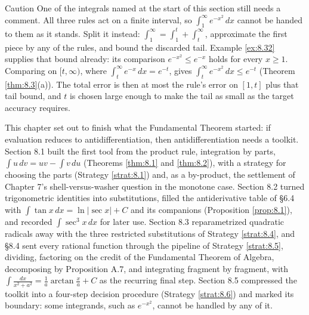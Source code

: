 \documentclass[a4paper,12pt,oneside]{memoir}
\begin{document}
\begin{envcaution}{Caution}{}{}
One of the integrals named at the start of this section still needs a comment. All three rules act on a finite interval, so \(\int_{1}^{\infty} e^{-x^{2}}\,dx\) cannot be handed to them as it stands. Split it instead: \(\int_{1}^{\infty} = \int_{1}^{t} + \int_{t}^{\infty}\), approximate the first piece by any of the rules, and bound the discarded tail. Example \ref{ex:8.32} supplies that bound already: its comparison \(e^{-x^{2}} \le e^{-x}\) holds for every \(x \ge 1\). Comparing on \([t, \infty)\), where \(\int_{t}^{\infty} e^{-x}\,dx = e^{-t}\), gives \(\int_{t}^{\infty} e^{-x^{2}}\,dx \le e^{-t}\) (Theorem \ref{thm:8.3}(a)). The total error is then at most the rule’s error on \([1, t]\) plus that tail bound, and \(t\) is chosen large enough to make the tail as small as the target accuracy requires.
\end{envcaution}
This chapter set out to finish what the Fundamental Theorem started: if evaluation reduces to antidifferentiation, then antidifferentiation needs a toolkit. Section 8.1 built the first tool from the product rule, integration by parts, \(\int u\,dv = uv - \int v\,du\) (Theorems \ref{thm:8.1} and \ref{thm:8.2}), with a strategy for choosing the parts (Strategy \ref{strat:8.1}) and, as a by-product, the settlement of Chapter 7’s shell-versus-washer question in the monotone case. Section 8.2 turned trigonometric identities into substitutions, filled the antiderivative table of §6.4 with \(\int\tan x\,dx = \ln\lvert\sec x\rvert + C\) and its companions (Proposition \ref{prop:8.1}), and recorded \(\int\sec^{3}x\,dx\) for later use. Section 8.3 reparametrized quadratic radicals away with the three restricted substitutions of Strategy \ref{strat:8.4}, and §8.4 sent every rational function through the pipeline of Strategy \ref{strat:8.5}, dividing, factoring on the credit of the Fundamental Theorem of Algebra, decomposing by Proposition A.7, and integrating fragment by fragment, with \(\int\frac{dx}{x^{2}+a^{2}} = \frac{1}{a}\arctan\frac{x}{a} + C\) as the recurring final step. Section 8.5 compressed the toolkit into a four-step decision procedure (Strategy \ref{strat:8.6}) and marked its boundary: some integrands, such as \(e^{-x^{2}}\), cannot be handled by any of it.
\end{document}
